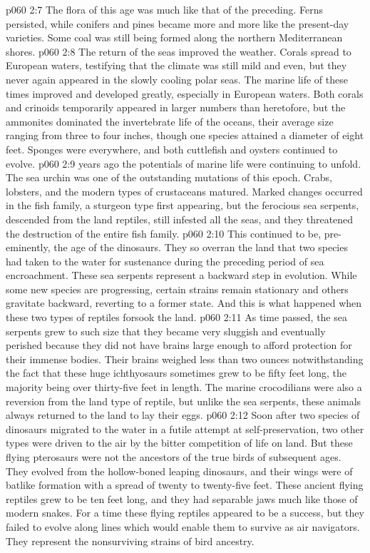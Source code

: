 \vs p060 2:7 The flora of this age was much like that of the preceding. Ferns persisted, while conifers and pines became more and more like the present\hyp{}day varieties. Some coal was still being formed along the northern Mediterranean shores.
\vs p060 2:8 The return of the seas improved the weather. Corals spread to European waters, testifying that the climate was still mild and even, but they never again appeared in the slowly cooling polar seas. The marine life of these times improved and developed greatly, especially in European waters. Both corals and crinoids temporarily appeared in larger numbers than heretofore, but the ammonites dominated the invertebrate life of the oceans, their average size ranging from three to four inches, though one species attained a diameter of eight feet. Sponges were everywhere, and both cuttlefish and oysters continued to evolve.
\pc \vs p060 2:9  years ago the potentials of marine life were continuing to unfold. The sea urchin was one of the outstanding mutations of this epoch. Crabs, lobsters, and the modern types of crustaceans matured. Marked changes occurred in the fish family, a sturgeon type first appearing, but the ferocious sea serpents, descended from the land reptiles, still infested all the seas, and they threatened the destruction of the entire fish family.
\vs p060 2:10 This continued to be, pre\hyp{}eminently, the age of the dinosaurs. They so overran the land that two species had taken to the water for sustenance during the preceding period of sea encroachment. These sea serpents represent a backward step in evolution. While some new species are progressing, certain strains remain stationary and others gravitate backward, reverting to a former state. And this is what happened when these two types of reptiles forsook the land.
\vs p060 2:11 As time passed, the sea serpents grew to such size that they became very sluggish and eventually perished because they did not have brains large enough to afford protection for their immense bodies. Their brains weighed less than two ounces notwithstanding the fact that these huge ichthyosaurs sometimes grew to be fifty feet long, the majority being over thirty\hyp{}five feet in length. The marine crocodilians were also a reversion from the land type of reptile, but unlike the sea serpents, these animals always returned to the land to lay their eggs.
\vs p060 2:12 Soon after two species of dinosaurs migrated to the water in a futile attempt at self\hyp{}preservation, two other types were driven to the air by the bitter competition of life on land. But these flying pterosaurs were not the ancestors of the true birds of subsequent ages. They evolved from the hollow\hyp{}boned leaping dinosaurs, and their wings were of batlike formation with a spread of twenty to twenty\hyp{}five feet. These ancient flying reptiles grew to be ten feet long, and they had separable jaws much like those of modern snakes. For a time these flying reptiles appeared to be a success, but they failed to evolve along lines which would enable them to survive as air navigators. They represent the nonsurviving strains of bird ancestry.

